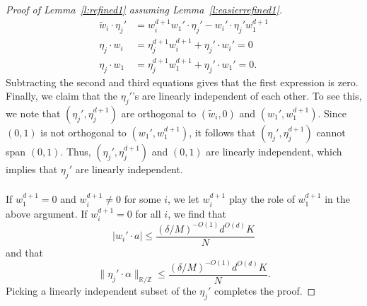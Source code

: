 \documentclass[11pt, a4paper]{amsart}
\theoremstyle{plain}
\theoremstyle{plain}
\theoremstyle{definition}
\theoremstyle{remark}
\numberwithin{equation}{section}
\numberwithin{lemma}{section}
\numberwithin{proposition}{section}
\numberwithin{corollary}{section}
\numberwithin{definition}{section}
\numberwithin{claim}{section}
\begin{document}
\begin{proof}[Proof of Lemma~\ref{l:refined1} assuming Lemma~\ref{l:easierrefined1}]
\begin{align*}
\tilde{w}_i \cdot \eta_j' &= w_i^{d+1} w_1' \cdot \eta_j' - w_i' \cdot \eta_j' w_1^{d+1} \\
\eta_j \cdot w_i &= \eta_j^{d+1} w_i^{d+1} + \eta_j' \cdot w_i' = 0 \\
\eta_j \cdot w_1 &= \eta_j^{d+1} w_1^{d+1} + \eta_j' \cdot w_1' = 0.
\end{align*}
Subtracting the second and third equations gives that the first expression is zero. Finally, we claim that the $\eta_j'$'s are linearly independent of each other. To see this, we note that $(\eta_j', \eta_j^{d+1})$ are orthogonal to $(\tilde{w}_i, 0)$ and $(w_1', w_1^{d+1})$. Since $(0, 1)$ is not orthogonal to $(w_1', w_1^{d+1})$, it follows that $(\eta_j', \eta_j^{d+1})$ cannot span $(0, 1)$. Thus, $(\eta_j', \eta_j^{d+1})$ and $(0, 1)$ are linearly independent, which implies that $\eta_j'$ are linearly independent. \\\\
If $w_1^{d+1} = 0$ and $w_i^{d+1} \neq 0$ for some $i$, we let $w_i^{d+1}$ play the role of $w_1^{d+1}$ in the above argument. If $w_i^{d+1} = 0$ for all $i$, we find that
$$|w_i' \cdot a| \le \frac{(\delta/M)^{-O(1)}d^{O(d)}K}{N}$$
and that
$$\|\eta_j' \cdot \alpha\|_{\mathbb{R}/\mathbb{Z}} \le \frac{(\delta/M)^{-O(1)}d^{O(d)}K}{N}.$$
Picking a linearly independent subset of the $\eta_j'$ completes the proof.    
\end{proof}
\end{document}
